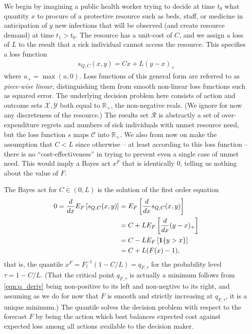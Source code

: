 \documentclass{article}
\begin{document}
We begin by imagining a public health worker trying to decide at time $t_0$ what quantity $x$ to procure of a protective resource such as beds, staff, or medicine in anticipation of $y$ new infections that will be observed (and create resource demand) at time $t_1>t_0$. The resource has a unit-cost of $C$, and we assign a loss of $L$ to the result that a sick individual cannot access the resource. This specifies a loss function  
\begin{align}
s_{Q,C}(x,y) = Cx + L(y-x)_+ \label{eqn:quantile_loss}
\end{align}
where $u_+ = \max(u,0)$.  Loss functions of this general form are referred to as \emph{piece-wise linear}, distinguishing them from smooth non-linear loss functions such as squared error.
The underlying decision problem here consists of action and outcome sets $\mathcal{X},\mathcal{Y}$ both equal to $\mathbb{R}_+$, the non-negative reals.  (We ignore for now any discreteness of the resource.) The results set $\mathcal{R}$ is abstractly a set of over-expenditure regrets and numbers of sick individuals with unmet resource need, but the loss function $s$ maps $\mathcal{C}$ into $\mathbb{R}_+$. We also from now on make the assumption that $C < L$ since otherwise -- at least according to this loss function -- there is no ``cost-effectiveness'' in trying to prevent even a single case of unmet need. This would imply a Bayes act $x^F$ that is identically 0, telling us nothing about the value of $F$.

The Bayes act for $C \in (0,L)$ is the solution of the first order equation 
\begin{align}
0 = \frac{d {} }{d {x}} E_F\left[s_{Q,C}(x,y)\right] &= E_F\left[\frac{d {} }{d {x}}s_{Q,C}(x,y)\right] \\
&= C + LE_F\left[\frac{d {} }{d {x}}(y-x)_+\right] \\
&= C - LE_F\left[\mathbf{1}\{y > x\}\right] \\
&= C + L(F(x) - 1), \label{eqn:q_deriv}
\end{align}
that is, the quantile $x^F = F_l^{-1}(1 - C/L) = q_{F,\tau}$ for the probability level $\tau = 1-C/L$. (That the critical point $q_{F,\tau}$ is actually a minimum follows from \eqref{eqn:q_deriv} being non-positive to its left and non-negtive to its right, and assuming as we do for now that $F$ is smooth and strictly increasing at $q_{F,\tau}$, it is a unique minimum.) The quantile solves the decision problem with respect to the forecast $F$ by being the action which best balances expected cost against expected loss among all actions available to the decision maker.
\end{document}
